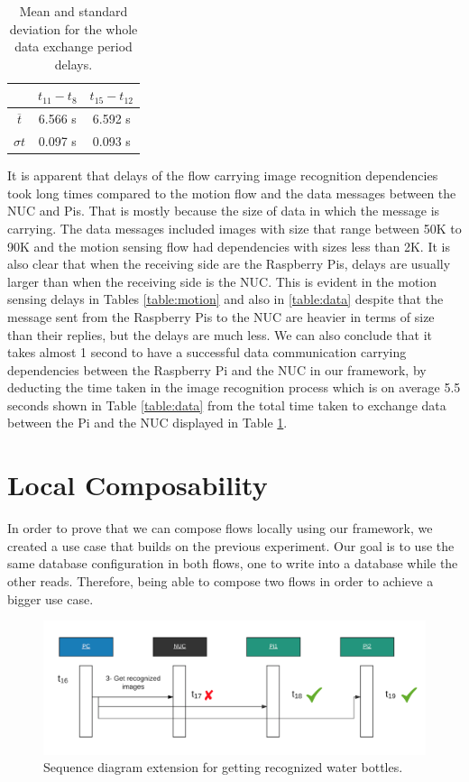 \begin{table}[H]
	\centering
	\begin{tabular}{c|c|c|}	\toprule
		&$t_{11} - t_8$  & $t_{15} - t_{12}$ \\ \midrule
		$ \overline{t} $&6.566 s&	6.592 s\\
		$ \sigma t $&0.097 s&	0.093 s\\
	\end{tabular}
	\caption{Mean and standard deviation for the whole data exchange period delays.}
	\label{table:total}
\end{table}


\noindent It is apparent that delays of the flow carrying image recognition dependencies took long times compared to the motion flow and the data messages between the NUC and Pis. That is mostly because the size of data in which the message is carrying. The data messages included images with size that range  between 50K to 90K  and the motion sensing flow had dependencies with sizes less than 2K. It is also clear that when the receiving side are the Raspberry Pis, delays are usually larger than when the receiving side is the NUC. This is evident in the motion sensing delays in Tables \ref{table:motion} and  also in \ref{table:data} despite that the message sent from the Raspberry Pis to the NUC are heavier   in terms of size than their replies, but the delays are much less. We can also conclude that it takes almost 1 second to have a successful data communication carrying dependencies between the Raspberry Pi and the NUC in our framework, by deducting the time taken in the image recognition process which is on average 5.5 seconds shown in Table \ref{table:data}  from the total time taken to exchange data between the Pi and the  NUC displayed in Table \ref{table:total}.

\section{Local Composability}
In order to prove that we can compose flows locally using our framework, we created a use case that builds on the  previous experiment. Our goal is to use the same database configuration in both flows, one to write into a database while the other reads. Therefore, being able to compose two flows in order to achieve a bigger use case.
\begin{figure}[H]
	\centering
	\includegraphics[scale=0.6]{images/sequence-diagram-2.png}
	\caption{Sequence diagram  extension for getting recognized water bottles.}
	\label{fig:sd-images}
\end{figure} 

